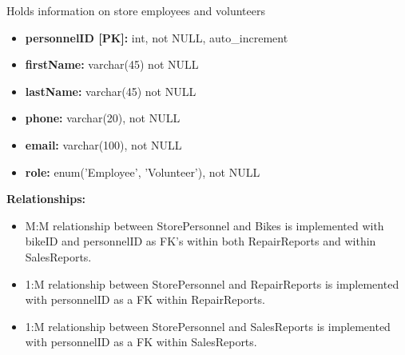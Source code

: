 \documentclass{article}
\begin{document}
\vspace{0.5cm}

\begin{tcolorbox}[colback=secondarycolor, colframe=primarycolor, title=\textbf{StorePersonnel Table}]
Holds information on store employees and volunteers
\vspace{0.2cm}

\begin{itemize}
  \item \textbf{personnelID [PK]:} int, not NULL, auto\_increment
  \item \textbf{firstName:} varchar(45) not NULL
  \item \textbf{lastName:} varchar(45) not NULL
  \item \textbf{phone:} varchar(20), not NULL
  \item \textbf{email:} varchar(100), not NULL
  \item \textbf{role:} enum('Employee', 'Volunteer'), not NULL
\end{itemize}
\vspace{0.2cm}

\textbf{Relationships:}
\vspace{0.2cm}
\begin{itemize}
  \item M:M relationship between StorePersonnel and Bikes is implemented with bikeID and personnelID as FK's within both RepairReports and within SalesReports.
  \item 1:M relationship between StorePersonnel and RepairReports is implemented with personnelID as a FK within RepairReports.
  \item 1:M relationship between StorePersonnel and SalesReports is implemented with personnelID as a FK within SalesReports.
\end{itemize}
\end{tcolorbox}

\vspace{0.5cm}
\end{document}
